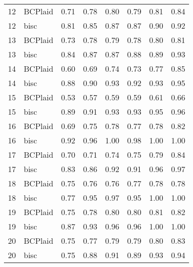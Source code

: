 \begin{table}[ht]
\begin{tabular}{rlrrrrrr}
   12 & BCPlaid & 0.71 & 0.78 & 0.80 & 0.79 & 0.81 & 0.84 \\ 
   12 & bisc & 0.81 & 0.85 & 0.87 & 0.87 & 0.90 & 0.92 \\ 
   13 & BCPlaid & 0.73 & 0.78 & 0.79 & 0.78 & 0.80 & 0.81 \\ 
   13 & bisc & 0.84 & 0.87 & 0.87 & 0.88 & 0.89 & 0.93 \\ 
   14 & BCPlaid & 0.60 & 0.69 & 0.74 & 0.73 & 0.77 & 0.85 \\ 
   14 & bisc & 0.88 & 0.90 & 0.93 & 0.92 & 0.93 & 0.95 \\ 
   15 & BCPlaid & 0.53 & 0.57 & 0.59 & 0.59 & 0.61 & 0.66 \\ 
   15 & bisc & 0.89 & 0.91 & 0.93 & 0.93 & 0.95 & 0.96 \\ 
   16 & BCPlaid & 0.69 & 0.75 & 0.78 & 0.77 & 0.78 & 0.82 \\ 
   16 & bisc & 0.92 & 0.96 & 1.00 & 0.98 & 1.00 & 1.00 \\ 
   17 & BCPlaid & 0.70 & 0.71 & 0.74 & 0.75 & 0.79 & 0.84 \\ 
   17 & bisc & 0.83 & 0.86 & 0.92 & 0.91 & 0.96 & 0.97 \\ 
   18 & BCPlaid & 0.75 & 0.76 & 0.76 & 0.77 & 0.78 & 0.78 \\ 
   18 & bisc & 0.77 & 0.95 & 0.97 & 0.95 & 1.00 & 1.00 \\ 
   19 & BCPlaid & 0.75 & 0.78 & 0.80 & 0.80 & 0.81 & 0.82 \\ 
   19 & bisc & 0.87 & 0.93 & 0.96 & 0.96 & 1.00 & 1.00 \\ 
   20 & BCPlaid & 0.75 & 0.77 & 0.79 & 0.79 & 0.80 & 0.83 \\ 
   20 & bisc & 0.75 & 0.88 & 0.91 & 0.89 & 0.93 & 0.94 \\ 
   \bottomrule
\end{tabular}
\end{table}
